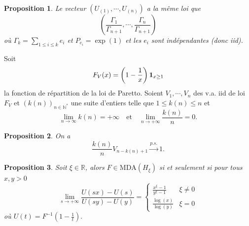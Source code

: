 \documentclass[10p,a4paper,reqno,titlepage]{report}
\newcommand{\R}{\mathbb{R}}
\newcommand{\N}{\mathbb{N}}
\newcommand{\indic}{\mathrm{{\bf 1}}}
\theoremstyle{plain}
\newtheorem{prop}[prop]{Proposition}
\theoremstyle{definition}
\newcommand{\cvps}{\stackrel{p.s.}{\longrightarrow}}
\begin{document}
\begin{prop}
	Le vecteur  $(U_{(1)},\cdots, U_{(n)})$ a la même loi que 
	$$ \left( \frac{\Gamma_1}{\Gamma_{n+1}} ,\cdots,\frac{\Gamma_n}{\Gamma_{n+1}}\right)$$
	où $\Gamma_k= \sum_{1\leq i \leq k} e_i$ et $P_{e_i}= \exp(1)$ et les $e_i$ sont indépendantes (donc iid).
\end{prop}
Soit 
$$ F_V (x) = \left(1- \frac{1}{x}  \right) \indic_{x \geq 1}$$
la fonction de répartition de la loi de Paretto. Soient $V_1,\cdots , V_n $ des v.a. iid de loi $F_V$ et $(k(n))_{n \in\N^*}$ une suite d'entiers telle que $1 \leq k(n)\leq n$ et 
$$
\lim_{n\to \infty} k(n)= +\infty\quad \text{et} \quad \lim_{n \to + \infty} \frac{k(n)}{n}=0.$$
\begin{prop}
	On a 
	$$ \frac{k(n)}{n}V_{n-k(n)+1} \cvps 1.$$
\end{prop}

\begin{prop}
Soit $\xi \in\R$, alors $F \in \mathrm{MDA}(H_\xi)$ si et seulement si pour tous $x,y > 0$
$$ \lim_{s \to +\infty} \frac{U(sx) - U(s)}{U(sy) - U(y)} = \left\{ \begin{array}{ll}
	\frac{x^\xi -1}{y^\xi -1}& \xi \neq 0\\
	\frac{\log(x)}{\log(y)} & \xi =0
\end{array}\right.$$
où $U(t) = F^{-1}(1 -\tfrac{1}{t}).$
\end{prop}
\end{document}
